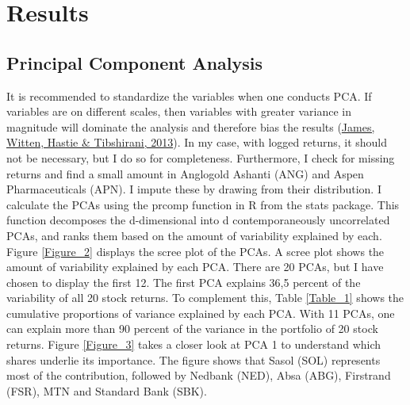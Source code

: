\documentclass[11pt,preprint, authoryear]{elsarticle}
\numberwithin{equation}{section}
\numberwithin{figure}{section}
\numberwithin{table}{section}
\begin{document}
\hypertarget{results}{%
\section{\texorpdfstring{Results
\label{Results}}{Results }}\label{results}}

\hypertarget{principal-component-analysis}{%
\subsection{Principal Component
Analysis}\label{principal-component-analysis}}

It is recommended to standardize the variables when one conducts PCA. If
variables are on different scales, then variables with greater variance
in magnitude will dominate the analysis and therefore bias the results
(\protect\hyperlink{ref-ISLR}{James, Witten, Hastie \& Tibshirani,
2013}). In my case, with logged returns, it should not be necessary, but
I do so for completeness. Furthermore, I check for missing returns and
find a small amount in Anglogold Ashanti (ANG) and Aspen Pharmaceuticals
(APN). I impute these by drawing from their distribution. I calculate
the PCAs using the prcomp function in R from the stats package. This
function decomposes the d-dimensional into d contemporaneously
uncorrelated PCAs, and ranks them based on the amount of variability
explained by each. Figure \ref{Figure_2} displays the scree plot of the
PCAs. A scree plot shows the amount of variability explained by each
PCA. There are 20 PCAs, but I have chosen to display the first 12. The
first PCA explains 36,5 percent of the variability of all 20 stock
returns. To complement this, Table \ref{Table_1} shows the cumulative
proportions of variance explained by each PCA. With 11 PCAs, one can
explain more than 90 percent of the variance in the portfolio of 20
stock returns. Figure \ref{Figure_3} takes a closer look at PCA 1 to
understand which shares underlie its importance. The figure shows that
Sasol (SOL) represents most of the contribution, followed by Nedbank
(NED), Absa (ABG), Firstrand (FSR), MTN and Standard Bank (SBK).
\end{document}
